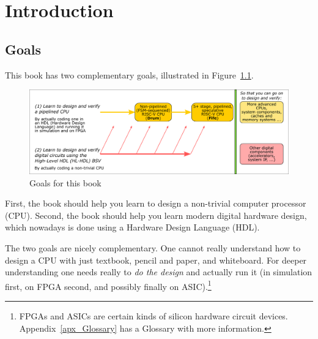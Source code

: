 

\chapter{Introduction}



\setcounter{page}{1}
\renewcommand{\thepage}{\arabic{chapter}-\arabic{page}}

\label{ch_intro}


\section{Goals}

\label{Sec_Goals}

This book has two complementary goals, illustrated in Figure~\ref{Fig_Goals}.
\begin{figure}[htbp]
  \centerline{\includegraphics[width=6in,angle=0]{Figures/Fig_Goals}}
  \caption{\label{Fig_Goals}Goals for this book}
\end{figure}

First, the book should help you learn to design a non-trivial computer
processor (CPU).  Second, the book should help you learn modern
digital hardware design, which nowadays is done using a Hardware
Design Language (HDL).

The two goals are nicely complementary.  One cannot really understand
how to design a CPU with just textbook, pencil and paper, and
whiteboard.  For deeper understanding one needs really to \emph{do the
design} and actually run it (in simulation first, on FPGA second, and
possibly finally on ASIC).\footnote{FPGAs and ASICs are certain kinds
of silicon hardware circuit devices.  Appendix~\ref{apx_Glossary} has
a Glossary with more information.}

